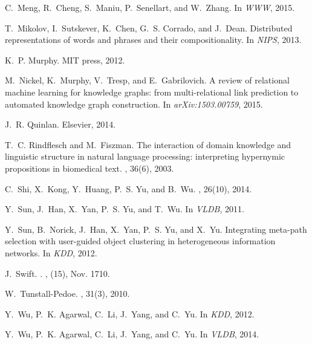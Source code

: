 \documentclass[reprint,twocolumn,showpacs,preprintnumbers,amsmath, aps,pre,amssymb]{revtex4-1}
\begin{document}
\begin{thebibliography}{10}
C.~Meng, R.~Cheng, S.~Maniu, P.~Senellart, and W.~Zhang.
\newblock In {\em WWW}, 2015.

T.~Mikolov, I.~Sutskever, K.~Chen, G.~S. Corrado, and J.~Dean.
\newblock Distributed representations of words and phrases and their
  compositionality.
\newblock In {\em NIPS}, 2013.

K.~P. Murphy.
\newblock MIT press, 2012.

M.~Nickel, K.~Murphy, V.~Tresp, and E.~Gabrilovich.
\newblock A review of relational machine learning for knowledge graphs: from
  multi-relational link prediction to automated knowledge graph construction.
\newblock In {\em arXiv:1503.00759}, 2015.

J.~R. Quinlan.
\newblock Elsevier, 2014.

T.~C. Rindflesch and M.~Fiszman.
\newblock The interaction of domain knowledge and linguistic structure in
  natural language processing: interpreting hypernymic propositions in
  biomedical text.
, 36(6), 2003.

C.~Shi, X.~Kong, Y.~Huang, P.~S. Yu, and B.~Wu.
, 26(10), 2014.

Y.~Sun, J.~Han, X.~Yan, P.~S. Yu, and T.~Wu.
\newblock In {\em VLDB}, 2011.

Y.~Sun, B.~Norick, J.~Han, X.~Yan, P.~S. Yu, and X.~Yu.
\newblock Integrating meta-path selection with user-guided object clustering in
  heterogeneous information networks.
\newblock In {\em KDD}, 2012.

J.~Swift.
\newblock {}.
, (15), Nov. 1710.

W.~Tunstall-Pedoe.
, 31(3), 2010.

Y.~Wu, P.~K. Agarwal, C.~Li, J.~Yang, and C.~Yu.
\newblock In {\em KDD}, 2012.

Y.~Wu, P.~K. Agarwal, C.~Li, J.~Yang, and C.~Yu.
\newblock In {\em VLDB}, 2014.

\end{thebibliography}
\end{document}
